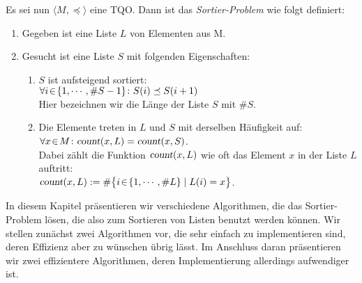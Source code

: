 Es sei nun $\langle M, \preceq \rangle$ eine \textsc{TQO}.  Dann ist das \emph{Sortier-Problem} wie
folgt definiert:
\begin{enumerate}
\item Gegeben ist eine Liste $L$ von Elementen aus M.
\item Gesucht ist eine Liste $S$ mit folgenden Eigenschaften: 
  \begin{enumerate}
  \item $S$ ist aufsteigend sortiert: \\[0.2cm]
        \hspace*{1.3cm} 
        $\forall i \!\in\! \{ 1, \cdots, \#S-1 \} \colon S(i) \preceq S(i+1)$ \\[0.2cm]
        Hier bezeichnen wir die L\"ange der Liste $S$ mit $\#S$.
  \item Die Elemente treten in $L$ und $S$ mit derselben H\"aufigkeit auf: \\[0.2cm]
        \hspace*{1.3cm} 
        $\forall x\!\in\! M \colon \textsl{count}(x,L) = \textsl{count}(x,S)$.
        \\[0.2cm]
        Dabei z\"ahlt die Funktion $\textsl{count}(x,L)$ wie oft das Element $x$ in der
        Liste $L$ auftritt: \\[0.2cm]
        \hspace*{1.3cm}
        $\textsl{count}(x,L) := \# \bigl\{ i \!\in\! \{1,\cdots,\#L\} \mid L(i) = x \bigr\}$.
  \end{enumerate}
\end{enumerate}
In diesem Kapitel pr\"asentieren wir verschiedene Algorithmen, die das Sortier-Problem
l\"osen, die also  zum Sortieren von Listen benutzt werden k\"onnen.
Wir stellen zun\"achst zwei Algorithmen vor, die sehr einfach zu implementieren sind, deren
Effizienz aber zu w\"unschen \"ubrig l\"asst.  Im Anschluss daran pr\"asentieren wir zwei
effizientere Algorithmen, deren Implementierung allerdings aufwendiger ist.

